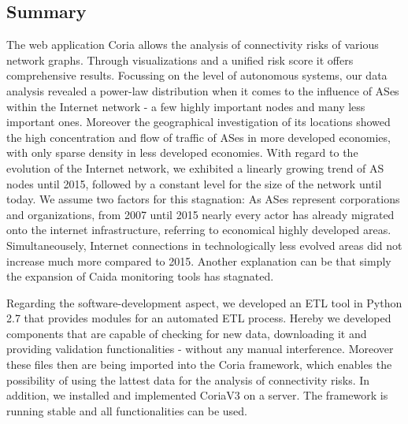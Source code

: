 \documentclass[conference, 11pt]{IEEEtran}
\begin{document}
\subsection{Summary}

The web application Coria allows the analysis of connectivity risks of various network graphs. Through visualizations and a unified risk score it offers comprehensive results. Focussing on the level of autonomous systems, our data analysis revealed a power-law distribution when it comes to the influence of ASes within the Internet network - a few highly important nodes and many less important ones. Moreover the geographical investigation of its locations showed the high concentration and flow of traffic of ASes in more developed economies, with only sparse density in less developed economies. With regard to the evolution of the Internet network, we exhibited a linearly growing trend of AS nodes until 2015, followed by a constant level for the size of the network until today. We assume two factors for this stagnation: As ASes represent corporations and organizations, from 2007 until 2015 nearly every actor has already migrated onto the internet infrastructure, referring to economical highly developed areas. Simultaneousely, Internet connections in technologically less evolved areas did not increase much more compared to 2015.  Another explanation can be that simply the expansion of Caida monitoring tools has stagnated.

Regarding the software-development aspect, we developed an ETL tool in Python 2.7 that provides modules for an automated ETL process. Hereby we developed components that are capable of checking for new data, downloading it and providing validation functionalities - without any manual interference. Moreover these files then are being imported into the Coria framework, which enables the possibility of using the lattest data for the analysis of connectivity risks. In addition, we installed and implemented CoriaV3 on a server. The framework is running stable and all functionalities can be used. \\
 
\end{document}
